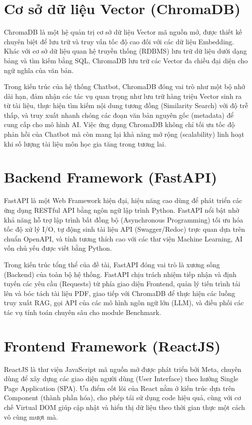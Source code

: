 \section{Cơ sở dữ liệu Vector (ChromaDB)}

ChromaDB là một hệ quản trị cơ sở dữ liệu Vector mã nguồn mở, được thiết kế chuyên biệt để lưu trữ và truy vấn tốc độ cao đối với các dữ liệu Embedding. Khác với cơ sở dữ liệu quan hệ truyền thống (RDBMS) lưu trữ dữ liệu dưới dạng bảng và tìm kiếm bằng SQL, ChromaDB lưu trữ các Vector đa chiều đại diện cho ngữ nghĩa của văn bản.

Trong kiến trúc của hệ thống Chatbot, ChromaDB đóng vai trò như một bộ nhớ dài hạn, đảm nhận các tác vụ quan trọng như lưu trữ hàng triệu Vector sinh ra từ tài liệu, thực hiện tìm kiếm nội dung tương đồng (Similarity Search) với độ trễ thấp, và truy xuất nhanh chóng các đoạn văn bản nguyên gốc (metadata) để cung cấp cho mô hình AI. Việc ứng dụng ChromaDB không chỉ tối ưu tốc độ phản hồi của Chatbot mà còn mang lại khả năng mở rộng (scalability) linh hoạt khi số lượng tài liệu môn học gia tăng trong tương lai.

\section{Backend Framework (FastAPI)}

FastAPI là một Web Framework hiện đại, hiệu năng cao dùng để phát triển các ứng dụng RESTful API bằng ngôn ngữ lập trình Python. FastAPI nổi bật nhờ khả năng hỗ trợ lập trình bất đồng bộ (Asynchronous Programming) tối ưu hóa tốc độ xử lý I/O, tự động sinh tài liệu API (Swagger/Redoc) trực quan dựa trên chuẩn OpenAPI, và tính tương thích cao với các thư viện Machine Learning, AI vốn chủ yếu được viết bằng Python.

Trong kiến trúc tổng thể của đề tài, FastAPI đóng vai trò là xương sống (Backend) của toàn bộ hệ thống. FastAPI chịu trách nhiệm tiếp nhận và định tuyến các yêu cầu (Requests) từ phía giao diện Frontend, quản lý tiến trình tải lên và bóc tách tài liệu PDF, giao tiếp với ChromaDB để thực hiện các luồng truy xuất RAG, gọi API của các mô hình ngôn ngữ lớn (LLM), và điều phối các tác vụ tính toán chuyên sâu cho module Benchmark.

\section{Frontend Framework (ReactJS)}

ReactJS là thư viện JavaScript mã nguồn mở được phát triển bởi Meta, chuyên dùng để xây dựng các giao diện người dùng (User Interface) theo hướng Single Page Application (SPA). Ưu điểm cốt lõi của React nằm ở kiến trúc dựa trên Component (thành phần hóa), cho phép tái sử dụng code hiệu quả, cùng với cơ chế Virtual DOM giúp cập nhật và hiển thị dữ liệu theo thời gian thực một cách vô cùng mượt mà.

